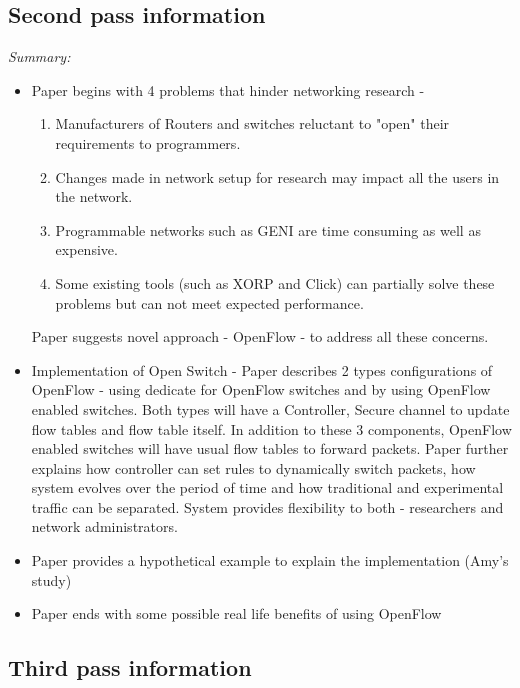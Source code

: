 \documentclass[letterpaper,twocolumn,10pt]{article}
\begin{document}
\subsection{Second pass information}
\label{sec:second}



{\it Summary:} 

\begin{itemize}

\item Paper begins with 4 problems that hinder networking research - 
\begin{enumerate}
\item Manufacturers of Routers and switches reluctant to "open" their requirements to programmers.
\item Changes made in network setup for research may impact all the users in the network.
\item Programmable networks such as GENI are time consuming as well as expensive.
\item Some existing tools (such as XORP and Click) can partially solve these problems but can not meet expected performance. 
\end{enumerate}
Paper suggests novel approach - OpenFlow - to address all these concerns.

\item Implementation of Open Switch - Paper describes 2 types configurations of OpenFlow - using dedicate for OpenFlow switches and by using OpenFlow enabled switches. Both types will have a Controller, Secure channel to update flow tables and flow table itself. In addition to these 3 components, OpenFlow enabled switches will have usual flow tables to forward packets. Paper further explains how controller can set rules to dynamically switch packets, how system evolves over the period of time and how traditional and experimental traffic can be separated. System provides flexibility to both - researchers and network administrators.

\item Paper provides a hypothetical example to explain the implementation (Amy's study)
\item Paper ends with some possible real life benefits of using OpenFlow

\end{itemize}

\subsection{Third pass information}
\label{sec:third}
\end{document}
